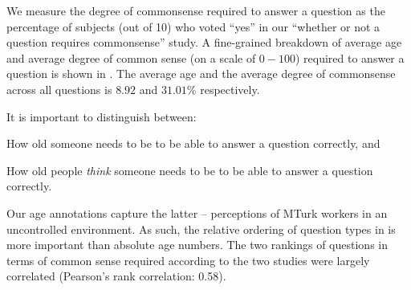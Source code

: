 We measure the degree of commonsense required to answer a question as the percentage of subjects (out of 10) who voted ``yes'' in our ``whether or not a question requires commonsense'' study.
A fine-grained breakdown of average age and average degree of common sense (on a scale of $0-100$) required to answer a question is shown in . The average age and the average degree of commonsense across all questions is $8.92$ and $31.01\%$ respectively. 


It is important to distinguish between:
\begin{compactenum}
\item How old someone needs to be to be able to answer a question correctly,  and
\item How old people \emph{think} someone needs to be to be able to answer a question correctly. 
\end{compactenum}

Our age annotations capture the latter -- perceptions of MTurk workers in an uncontrolled environment. As such, the relative ordering of question types in  is more important than absolute age numbers.
The two rankings of questions in terms of common sense required according to the two studies 
were largely correlated (Pearson's rank correlation: 0.58). 

